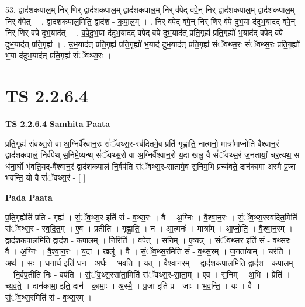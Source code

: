 \documentclass[17pt]{extarticle}
\begin{document}
53. द्वाद॑शकपाल॒म् निर् णिर् द्वाद॑शकपाल॒म् द्वाद॑शकपाल॒म् निर् व॑पेद् वपे॒न् निर् द्वाद॑शकपाल॒म् द्वाद॑शकपाल॒म् निर् व॑पेत् । . द्वाद॑शकपाल॒मिति॒ द्वाद॑श - क॒पा॒ल॒म् । . निर् व॑पेद् वपे॒न् निर् णिर् व॑पे दुभ॒या द॑दुभ॒याद॑द् वपे॒न् निर् णिर् व॑पे दुभ॒याद॑त् । . व॒पे॒दु॒भ॒या द॑दुभ॒याद॑द् वपेद् वपे दुभ॒याद॑त् प्रति॒गृह्य॑ प्रति॒गृह्यो॑ भ॒याद॑द् वपेद् वपे दुभ॒याद॑त् प्रति॒गृह्य॑ । . उ॒भ॒याद॑त् प्रति॒गृह्य॑ प्रति॒गृह्यो॑ भ॒याद॑ दुभ॒याद॑त् प्रति॒गृह्य॑ संॅवथ्स॒रः सं॑ॅवथ्स॒रः प्र॑ति॒गृह्यो॑ भ॒या द॑दुभ॒याद॑त् प्रति॒गृह्य॑ संॅवथ्स॒रः । \newline
\pagebreak
{}
\section*{ TS 2.2.6.4 }

\textbf{TS 2.2.6.4 } \newline
\textbf{Samhita Paata} \newline

प्रति॒गृह्य॑ संवथ्स॒रो वा अ॒ग्निर्वै᳚श्वान॒रः सं॑ॅवथ्स॒र-स्व॑दितमे॒व प्रति॑ गृह्णाति॒ नात्मनो॒ मात्रा॑माप्नोति वैश्वान॒रं द्वाद॑शकपालं॒ निर्व॑पेथ्-स॒निमे॒ष्यन्थ्-सं॑ॅवथ्स॒रो वा अ॒ग्निर्वै᳚श्वान॒रो य॒दा खलु॒ वै सं॑ॅवथ्स॒रं ज॒नता॑यां॒ चर॒त्यथ॒ स ध॑ना॒र्घो भ॑वति॒यद्-वै᳚श्वान॒रं द्वाद॑शकपालं नि॒र्वप॑ति संॅवथ्स॒र-सा॑तामे॒व स॒निम॒भि प्रच्य॑वते॒ दान॑कामा अस्मै प्र॒जा भ॑वन्ति॒ यो वै सं॑ॅवथ्स॒रं - [  ] \newline

\textbf{Pada Paata} \newline

प्र॒ति॒गृह्येति॑ प्रति - गृह्य॑ । सं॒ॅव॒थ्स॒र इति॑ सं - व॒थ्स॒रः । वै । अ॒ग्निः । वै॒श्वा॒न॒रः । सं॒ॅव॒थ्स॒रस्व॑दित॒मिति॑ संॅवथ्स॒र - स्व॒दि॒त॒म् । ए॒व । प्रतीति॑ । गृ॒ह्णा॒ति॒ । न । आ॒त्मनः॑ । मात्रा᳚म् । आ॒प्नो॒ति॒ । वै॒श्वा॒न॒रम् । द्वाद॑शकपाल॒मिति॒ द्वाद॑श - क॒पा॒ल॒म् । निरिति॑ । व॒पे॒त् । स॒निम् । ए॒ष्यन्न् । सं॒ॅव॒थ्स॒र इति॑ सं - व॒थ्स॒रः । वै । अ॒ग्निः । वै॒श्वा॒न॒रः । य॒दा । खलु॑ । वै । सं॒ॅव॒थ्स॒रमिति॑ सं - व॒थ्स॒रम् । ज॒नता॑याम् । चर॑ति । अथ॑ । सः । ध॒ना॒र्घ इति॑ धन - अ॒र्घः । भ॒व॒ति॒॒ । यत् । वै॒श्वा॒न॒रम् । द्वाद॑शकपाल॒मिति॒ द्वाद॑श - क॒पा॒ल॒म् । नि॒र्वप॒तीति॑ निः - वप॑ति । सं॒ॅव॒थ्स॒रसा॑ता॒मिति॑ संॅवथ्स॒र-सा॒ता॒म् । ए॒व । स॒निम् । अ॒भि । प्रेति॑ । च्य॒व॒ते॒ । दान॑कामा॒ इति॒ दान॑ - का॒माः॒ । अ॒स्मै॒ । प्र॒जा इति॑ प्र - जाः । भ॒व॒न्ति॒ । यः । वै । सं॒ॅव॒थ्स॒रमिति॑ सं - व॒थ्स॒रम् ।  \newline
\end{document}

